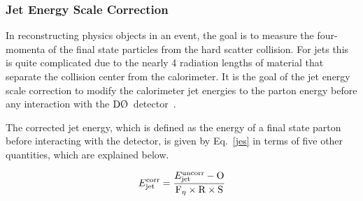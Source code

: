 \subsubsection{Jet Energy Scale Correction}

In reconstructing physics objects in an event, the goal is to measure the four-momenta of the final state particles from the hard scatter collision. For jets this is quite complicated due to the nearly 4 radiation lengths of material that separate the collision center from the calorimeter. It is the goal of the jet energy scale correction to modify the calorimeter jet energies to the parton energy before any interaction with the $\dzero$~detector~\cite{jes}.

The corrected jet energy, which is defined as the energy of a final state parton before interacting with the detector, is given by Eq.~\ref{jes} in terms of five other quantities, which are explained below.

\begin{equation}
\label{jes}
E_{\rm{jet}}^{\rm{corr}} = \frac{E_{\rm{jet}}^{\rm{uncorr}} - \rm{O}}{\rm{F}_{\eta} \times \rm{R} \times \rm{S}}
\end{equation}

